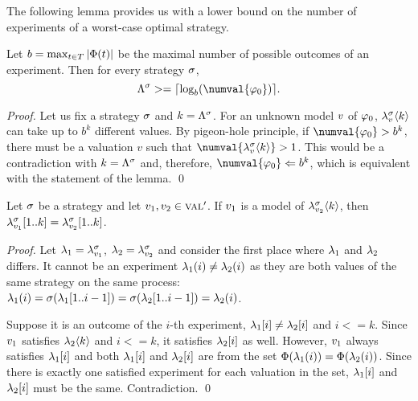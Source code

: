 The following lemma provides us with a lower bound on the number of
experiments of a worst-case optimal strategy.

\begin{lemma} \label{lma:lbound}
Let $b = \max_{t\in T} |\Phi(t)|$ be the maximal number of
  possible outcomes of an experiment. Then for every strategy $\sigma$,
  \[
  \lenmax{\stg} >= \lceil \log_b(\numval{\init}) \rceil.
  \]
\end{lemma}

\begin{proof}
Let us fix a strategy $\sigma$ and $k = \Lambda^{\sigma}$.
For an unknown model $v$ of $\varphi_0$,
  $\lambda^{\sigma}_{v}\langle k\rangle$ can take up to
  $b^k$ different values.
By pigeon-hole principle, if $\numval{\init} > b^k$, there must be a valuation
  $v$ such that $\numval{\stgknow{\stg}{\val}{k}} > 1$.
This would be a contradiction with $k = \Lambda^{\sigma}$ and, therefore,
  $\numval{\init} <= b^k$, which is equivalent with the statement of the lemma.
  \qed
\end{proof}

\begin{lemma} \label{lma:accumulatedknowledge}
Let $\sigma$ be a strategy and let $v_1, v_2 \in\textsc{val}'$.
If $v_1$ is a model of $\lambda^{\sigma}_{v_2}\langle k\rangle$,
  then $\lambda^{\sigma}_{v_1}[1..k] = \lambda^{\sigma}_{v_2}[1..k]$.
\end{lemma}

\begin{proof}
Let $\lambda_1 = \lambda^{\sigma}_{v_1}$, $\lambda_2 = \lambda^{\sigma}_{v_2}$
and consider the first place where $\lambda_1$ and $\lambda_2$ differs.
It cannot be an experiment $\lambda_1(i) \not= \lambda_2(i)$ as they are both
  values of the same strategy on the same process:
$\lambda_1(i) = \sigma(\lambda_1[1..i-1]) =
              \sigma(\lambda_2[1..i-1]) = \lambda_2(i)$.

Suppose it is an outcome of the $i$-th experiment, $\lambda_1[i] \not= \lambda_2[i]$
  and $i <= k$.
Since $v_1$ satisfies $\lambda_2\langle k\rangle$ and $i <= k$,
  it satisfies $\lambda_2[i]$ as well.
However, $v_1$ always satisfies $\lambda_1[i]$ and
  both $\lambda_1[i]$ and $\lambda_2[i]$ are from the set
  $\Phi(\lambda_1(i)) = \Phi(\lambda_2(i))$.
Since there is exactly one satisfied experiment for each valuation in the set,
  $\lambda_1[i]$ and $\lambda_2[i]$ must be the same.
Contradiction. \qed
\end{proof}


